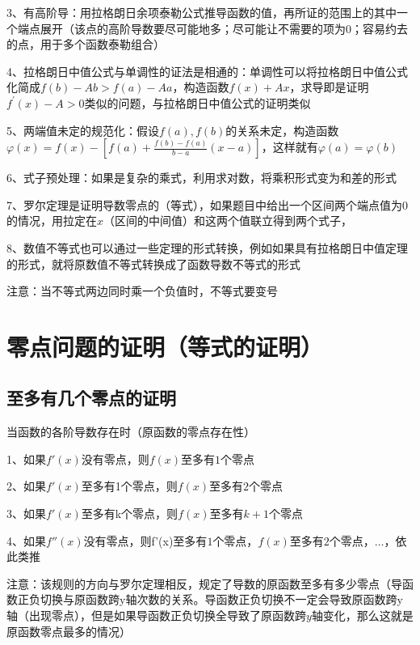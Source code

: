 3、有高阶导：用拉格朗日余项泰勒公式推导函数的值，再所证的范围上的其中一个端点展开（该点的高阶导数要尽可能地多；尽可能让不需要的项为0；容易约去的点，用于多个函数泰勒组合）

4、拉格朗日中值公式与单调性的证法是相通的：单调性可以将拉格朗日中值公式化简成$f(b)-Ab>f(a)-Aa$，构造函数$f(x)+Ax$，求导即是证明$f^{\prime}(x)-A>0$类似的问题，与拉格朗日中值公式的证明类似

5、两端值未定的规范化：假设$f(a),f(b)$的关系未定，构造函数$\varphi(x)=f(x)-\left[f(a)+\frac{f(b)-f(a)}{b-a}(x-a)\right]$，这样就有$\varphi(a)=\varphi(b)$

6、式子预处理：如果是复杂的乘式，利用求对数，将乘积形式变为和差的形式

7、罗尔定理是证明导数零点的（等式），如果题目中给出一个区间两个端点值为0的情况，用拉定在$x$（区间的中间值）和这两个值联立得到两个式子，

8、数值不等式也可以通过一些定理的形式转换，例如如果具有拉格朗日中值定理的形式，就将原数值不等式转换成了函数导数不等式的形式

注意：当不等式两边同时乘一个负值时，不等式要变号

\section{零点问题的证明（等式的证明）}



\subsection{至多有几个零点的证明}

当函数的各阶导数存在时（原函数的零点存在性）

1、如果$f'(x)$没有零点，则$f(x)$至多有$1$个零点

2、如果$f'(x)$至多有1个零点，则$f(x)$至多有$2$个零点

3、如果$f'(x)$至多有k个零点，则$f(x)$至多有$k+1$个零点

4、如果$f''(x)$没有零点，则f'(x)至多有$1$个零点，$f(x)$至多有$2$个零点，$…$，依此类推

注意：该规则的方向与罗尔定理相反，规定了导数的原函数至多有多少零点（导函数正负切换与原函数跨y轴次数的关系。导函数正负切换不一定会导致原函数跨y轴（出现零点），但是如果导函数正负切换全导致了原函数跨$y$轴变化，那么这就是原函数零点最多的情况）



